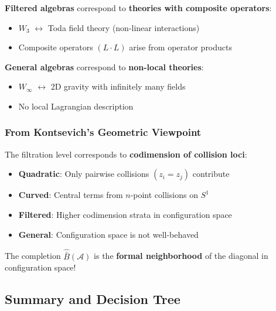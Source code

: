 \textbf{Filtered algebras} correspond to \textbf{theories with composite operators}:
\begin{itemize}
\item $W_3$ $\leftrightarrow$ Toda field theory (non-linear interactions)
\item Composite operators $(L \cdot L)$ arise from operator products
\end{itemize}

\textbf{General algebras} correspond to \textbf{non-local theories}:
\begin{itemize}
\item $W_\infty$ $\leftrightarrow$ 2D gravity with infinitely many fields
\item No local Lagrangian description
\end{itemize}

\subsubsection{From Kontsevich's Geometric Viewpoint}

The filtration level corresponds to \textbf{codimension of collision loci}:

\begin{itemize}
\item \textbf{Quadratic}: Only pairwise collisions $(z_i = z_j)$ contribute
\item \textbf{Curved}: Central terms from $n$-point collisions on $S^1$
\item \textbf{Filtered}: Higher codimension strata in configuration space
\item \textbf{General}: Configuration space is not well-behaved
\end{itemize}

The completion $\widehat{\bar{B}}(\mathcal{A})$ is the \textbf{formal neighborhood} of the 
diagonal in configuration space!

\subsection{Summary and Decision Tree}

